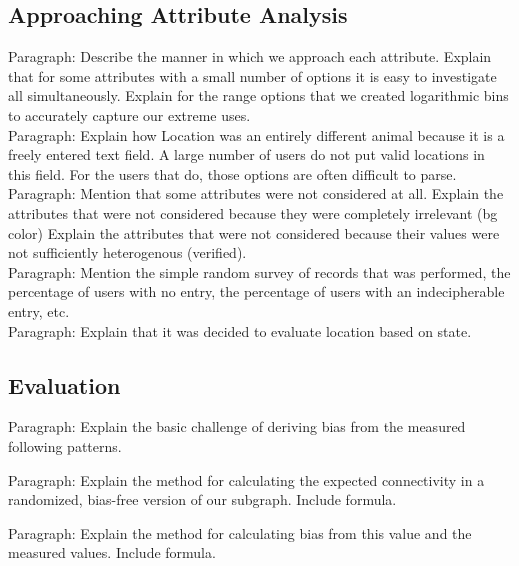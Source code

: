 \subsection{Approaching Attribute Analysis}

Paragraph: Describe the manner in which we approach each attribute.  Explain that for some attributes with a small number of options it is easy to investigate all simultaneously.  Explain for the range options that we created logarithmic bins to accurately capture our extreme uses.\\

Paragraph: Explain how Location was an entirely different animal because it is a freely entered text field.  A large number of users do not put valid locations in this field.  For the users that do, those options are often difficult to parse.\\

Paragraph:  Mention that some attributes were not considered at all.  Explain the attributes that were not considered because they were completely irrelevant (bg color)  Explain the attributes that were not considered because their values were not sufficiently heterogenous (verified).\\

Paragraph: Mention the simple random survey of records that was performed, the percentage of users with no entry, the percentage of users with an indecipherable entry, etc.\\

Paragraph: Explain that it was decided to evaluate location based on state.\\

\subsection{Evaluation}

Paragraph: Explain the basic challenge of deriving bias from the measured following patterns.

Paragraph: Explain the method for calculating the expected connectivity in a randomized, bias-free version of our subgraph.  Include formula.

Paragraph: Explain the method for calculating bias from this value and the measured values.  Include formula.

